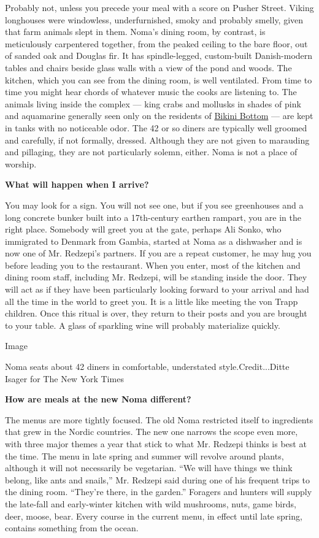 Probably not, unless you precede your meal with a score on Pusher
Street. Viking longhouses were windowless, underfurnished, smoky and
probably smelly, given that farm animals slept in them. Noma's dining
room, by contrast, is meticulously carpentered together, from the peaked
ceiling to the bare floor, out of sanded oak and Douglas fir. It has
spindle-legged, custom-built Danish-modern tables and chairs beside
glass walls with a view of the pond and woods. The kitchen, which you
can see from the dining room, is well ventilated. From time to time you
might hear chords of whatever music the cooks are listening to. The
animals living inside the complex --- king crabs and mollusks in shades
of pink and aquamarine generally seen only on the residents of
\href{https://www.youtube.com/watch?v=RjUVOBory70}{Bikini Bottom} ---
are kept in tanks with no noticeable odor. The 42 or so diners are
typically well groomed and carefully, if not formally, dressed. Although
they are not given to marauding and pillaging, they are not particularly
solemn, either. Noma is not a place of worship.

\textbf{What will happen when I arrive?}

You may look for a sign. You will not see one, but if you see
greenhouses and a long concrete bunker built into a 17th-century earthen
rampart, you are in the right place. Somebody will greet you at the
gate, perhaps Ali Sonko, who immigrated to Denmark from Gambia, started
at Noma as a dishwasher and is now one of Mr. Redzepi's partners. If you
are a repeat customer, he may hug you before leading you to the
restaurant. When you enter, most of the kitchen and dining room staff,
including Mr. Redzepi, will be standing inside the door. They will act
as if they have been particularly looking forward to your arrival and
had all the time in the world to greet you. It is a little like meeting
the von Trapp children. Once this ritual is over, they return to their
posts and you are brought to your table. A glass of sparkling wine will
probably materialize quickly.

Image

Noma seats about 42 diners in comfortable, understated
style.Credit...Ditte Isager for The New York Times

\textbf{How are meals at the new Noma different?}

The menus are more tightly focused. The old Noma restricted itself to
ingredients that grew in the Nordic countries. The new one narrows the
scope even more, with three major themes a year that stick to what Mr.
Redzepi thinks is best at the time. The menu in late spring and summer
will revolve around plants, although it will not necessarily be
vegetarian. ``We will have things we think belong, like ants and
snails,'' Mr. Redzepi said during one of his frequent trips to the
dining room. ``They're there, in the garden.'' Foragers and hunters will
supply the late-fall and early-winter kitchen with wild mushrooms, nuts,
game birds, deer, moose, bear. Every course in the current menu, in
effect until late spring, contains something from the ocean.

